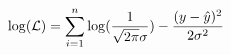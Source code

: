 \documentclass[preview]{standalone}
\begin{document}
\begin{align*}
\special{dvisvgm:raw <g id='unique000'>}\log(\mathcal{L})=\sum^n_{i=1}\log(\frac{1}{\sqrt{2\pi}\sigma})-\frac{(y-\hat{y})^2}{2\sigma^2}\special{dvisvgm:raw </g>}
\end{align*}
\end{document}

